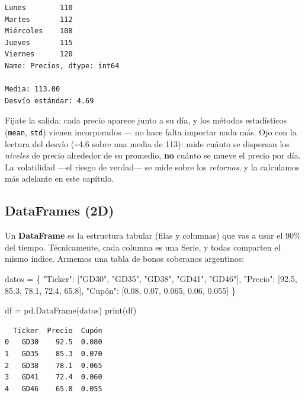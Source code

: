 \documentclass[
  spanish,
  letterpaper,
  DIV=11,
  numbers=noendperiod]{scrreprt}
\newenvironment{Shaded}{\begin{snugshade}}{\end{snugshade}}
\newcommand{\BuiltInTok}[1]{\textcolor[rgb]{0.00,0.23,0.31}{#1}}
\newcommand{\FloatTok}[1]{\textcolor[rgb]{0.68,0.00,0.00}{#1}}
\newcommand{\NormalTok}[1]{\textcolor[rgb]{0.00,0.23,0.31}{#1}}
\newcommand{\OperatorTok}[1]{\textcolor[rgb]{0.37,0.37,0.37}{#1}}
\newcommand{\StringTok}[1]{\textcolor[rgb]{0.13,0.47,0.30}{#1}}
\begin{document}
\begin{verbatim}
Lunes        110
Martes       112
Miércoles    108
Jueves       115
Viernes      120
Name: Precios, dtype: int64

Media: 113.00
Desvío estándar: 4.69
\end{verbatim}

Fijate la salida: cada precio aparece junto a su día, y los métodos
estadísticos (\texttt{mean}, \texttt{std}) vienen incorporados --- no
hace falta importar nada más. Ojo con la lectura del desvío
(\textasciitilde4.6 sobre una media de 113): mide cuánto se dispersan
los \emph{niveles} de precio alrededor de su promedio, \textbf{no}
cuánto se mueve el precio por día. La volatilidad ---el riesgo de
verdad--- se mide sobre los \emph{retornos}, y la calculamos más
adelante en este capítulo.

\subsection{DataFrames (2D)}\label{dataframes-2d}

Un \textbf{DataFrame} es la estructura tabular (filas y columnas) que
vas a usar el 90\% del tiempo. Técnicamente, cada columna es una Serie,
y todas comparten el mismo índice. Armemos una tabla de bonos soberanos
argentinos:

\label{dataframe-intro}
\begin{Shaded}
\begin{Highlighting}[]
\NormalTok{datos }\OperatorTok{=}\NormalTok{ \{}
    \StringTok{"Ticker"}\NormalTok{: [}\StringTok{"GD30"}\NormalTok{, }\StringTok{"GD35"}\NormalTok{, }\StringTok{"GD38"}\NormalTok{, }\StringTok{"GD41"}\NormalTok{, }\StringTok{"GD46"}\NormalTok{],}
    \StringTok{"Precio"}\NormalTok{: [}\FloatTok{92.5}\NormalTok{, }\FloatTok{85.3}\NormalTok{, }\FloatTok{78.1}\NormalTok{, }\FloatTok{72.4}\NormalTok{, }\FloatTok{65.8}\NormalTok{],}
    \StringTok{"Cupón"}\NormalTok{: [}\FloatTok{0.08}\NormalTok{, }\FloatTok{0.07}\NormalTok{, }\FloatTok{0.065}\NormalTok{, }\FloatTok{0.06}\NormalTok{, }\FloatTok{0.055}\NormalTok{]}
\NormalTok{\}}

\NormalTok{df }\OperatorTok{=}\NormalTok{ pd.DataFrame(datos)}
\BuiltInTok{print}\NormalTok{(df)}
\end{Highlighting}
\end{Shaded}

\begin{verbatim}
  Ticker  Precio  Cupón
0   GD30    92.5  0.080
1   GD35    85.3  0.070
2   GD38    78.1  0.065
3   GD41    72.4  0.060
4   GD46    65.8  0.055
\end{verbatim}
\end{document}
